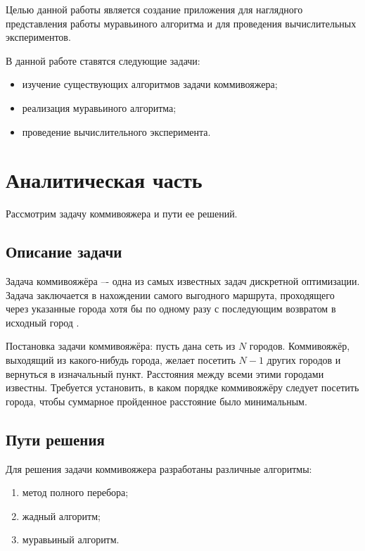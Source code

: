\documentclass[a4paper,12pt]{article}
\begin{document}
Целью данной работы является создание приложения для наглядного представления работы муравьиного
алгоритма и для проведения вычислительных экспериментов.

В данной работе ставятся следующие задачи:

\begin{itemize}
    \item изучение существующих алгоритмов задачи коммивояжера;
    \item реализация муравьиного алгоритма;
    \item проведение вычислительного эксперимента.
\end{itemize}

\newpage
\section{Аналитическая часть}

Рассмотрим задачу коммивояжера и пути ее решений.

\subsection{Описание задачи}

Задача коммивояжёра –- одна из самых известных задач дискретной оптимизации. Задача заключается в нахождении
самого выгодного маршрута, проходящего через указанные города хотя бы по одному разу с последующим возвратом
в исходный город \cite{Levitin}.

Постановка задачи коммивояжёра: пусть дана сеть из $N$ городов. Коммивояжёр, выходящий из какого-нибудь города,
желает посетить $N-1$ других городов и вернуться в изначальный пункт. Расстояния между всеми этими городами
известны. Требуется установить, в каком порядке коммивояжёру следует посетить города, чтобы суммарное пройденное
расстояние было минимальным.

\subsection{Пути решения}

Для решения задачи коммивояжера разработаны различные алгоритмы:

\begin{enumerate}
    \item метод полного перебора;
    \item жадный алгоритм;
    \item муравьиный алгоритм.
\end{enumerate}
\end{document}
